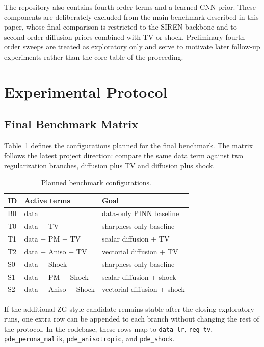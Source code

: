 \documentclass[conference]{IEEEtran}
\begin{document}
The repository also contains fourth-order terms and a learned CNN prior.
These components are deliberately excluded from the main benchmark
described in this paper, whose final comparison is restricted to the
SIREN backbone and to second-order diffusion priors combined with TV or
shock. Preliminary fourth-order sweeps are treated as exploratory only
and serve to motivate later follow-up experiments rather than the core
table of the proceeding.

\section{Experimental Protocol}
\subsection{Final Benchmark Matrix}
Table~\ref{tab:configs} defines the configurations planned for the
final benchmark. The matrix follows the latest project direction:
compare the same data term against two regularization branches,
diffusion plus TV and diffusion plus shock.

\begin{table}[t]
\caption{Planned benchmark configurations.}
\label{tab:configs}
\begin{center}
\small
\begin{tabular}{lll}
\toprule
ID & Active terms & Goal \\
\midrule
B0 & data & data-only PINN baseline \\
T0 & data + TV & sharpness-only baseline \\
T1 & data + PM + TV & scalar diffusion + TV \\
T2 & data + Aniso + TV & vectorial diffusion + TV \\
S0 & data + Shock & sharpness-only baseline \\
S1 & data + PM + Shock & scalar diffusion + shock \\
S2 & data + Aniso + Shock & vectorial diffusion + shock \\
\bottomrule
\end{tabular}
\end{center}
\end{table}

If the additional ZG-style candidate remains stable after the closing
exploratory runs, one extra row can be appended to each branch without
changing the rest of the protocol. In the codebase, these rows map to
\texttt{data\_lr}, \texttt{reg\_tv}, \texttt{pde\_perona\_malik},
\texttt{pde\_anisotropic}, and \texttt{pde\_shock}.
\end{document}
